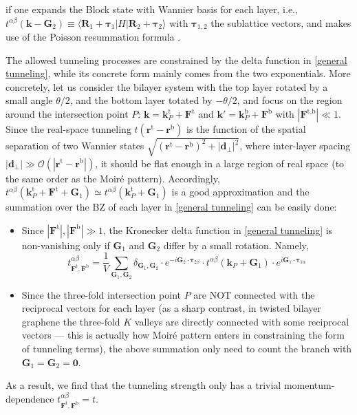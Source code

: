 \begin{subappendices}
	if one expands the Block state with Wannier basis for each layer, i.e., $t^{\alpha\beta}(\bm{k}-\bm{G}_2)\equiv\langle\bm{R}_1+\bm{\tau}_1|H|\bm{R}_2+\bm{\tau}_2\rangle$ with $\bm{\tau}_{1,2}$ the sublattice vectors, and makes use of the Poisson resummation formula \cite{ledwith2021lecture}.\par
	The allowed tunneling processes are constrained by the delta function in \eqref{general tunneling}, while its concrete form mainly comes from the two exponentials. More concretely, let us consider the bilayer system with the top layer rotated by a small angle $\theta/2$, and the bottom layer totated by $-\theta/2$, and focus on the region around the intersection point $P$: $\bm{k}=\bm{k}_P^{\text{t}}+\bm{F}^{\text{t}}$ and $\bm{k'}=\bm{k}_P^{\text{b}}+\bm{F}^{\text{b}}$ with $|\bm{F}^{\text{t,b}}|\ll1$. Since the real-space tunneling $t(\bm{r}^{\text{t}}-\bm{r}^{\text{b}})$ is the function of the spatial separation of two Wannier states $\sqrt{(\bm{r}^{\text{t}}-\bm{r}^{\text{b}})^2+|\bm{d}_\perp|^2}$, where inter-layer spacing $|\bm{d}_\perp|\gg\mathcal{O}(|\bm{r}^{\text{t}}-\bm{r}^{\text{b}}|)$, it should be flat enough in a large region of real space (to the same order as the Moir\'{e} pattern). Accordingly, $t^{\alpha\beta}(\bm{k}_P^{\text{t}}+\bm{F}^{\text{t}}+\bm{G}_1)\simeq t^{\alpha\beta}(\bm{k}_P^{\text{t}}+\bm{G}_1)$ is a good approximation and the summation over the BZ of each layer in \eqref{general tunneling} can be easily done:
	\begin{itemize}
		\item Since $|\bm{F}^\text{t}|, |\bm{F}^\text{b}|\gg1$, the Kronecker delta function in \eqref{general tunneling} is non-vanishing only if $\bm{G}_1$ and $\bm{G}_2$ differ by a small rotation. Namely,
			\begin{equation*}
				t^{\alpha\beta}_{\bm{F}^{\text{t}},\bm{F}^{\text{b}}}=\dfrac{1}{V}\sum_{\bm{G}_1,\bm{G}_2}\delta_{\bm{G}_1,\bm{G}_2}\cdot e^{-i\bm{G}_2\cdot\bm{\tau}_{2\beta}}\cdot t^{\alpha\beta}(\bm{k}_P+\bm{G}_1)\cdot e^{i\bm{G}_1\cdot\bm{\tau}_{1 \alpha}}
			\end{equation*}
		\item Since the three-fold intersection point $P$ are NOT connected with the reciprocal vectors for each layer (as a sharp contrast, in twisted bilayer graphene the three-fold $K$ valleys are directly connected with some reciprocal vectors --- this is actually how Moir\'{e} pattern enters in constraining the form of tunneling terms), the above summation only need to count the branch with $\bm{G}_1=\bm{G}_2=\bm{0}$.
	\end{itemize}
	As a result, we find that the tunneling strength only has a trivial momentum-dependence $t^{\alpha\beta}_{\bm{F}^{\text{t}},\bm{F}^{\text{b}}}=t$.\label{app:two-center approximation}

\end{subappendices}